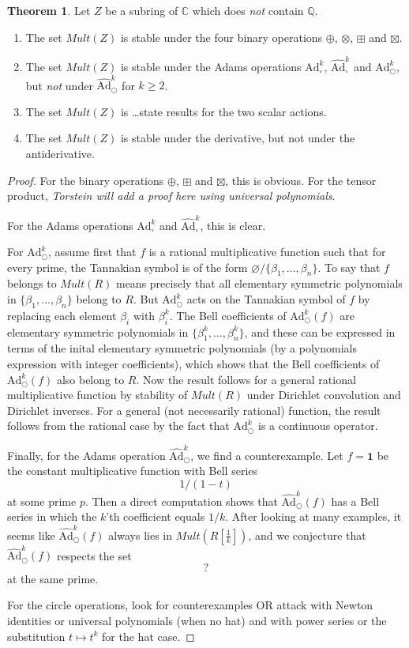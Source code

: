 \documentclass[a4paper]{article}
\theoremstyle{definition}
\newtheorem{theorem}{Theorem}[section]
\theoremstyle{remark}
\newcommand{\adam}[1]{\text{Ad}^{#1}_{\bigcirc}}
\newcommand{\hatadam}[1]{\widehat{\text{Ad}}^{#1}_{\bigcirc}}
\newcommand{\boxadam}[1]{\text{Ad}^{#1}_{\square}}
\newcommand{\hatboxadam}[1]{\widehat{\text{Ad}}^{#1}_{\square}}
\newcommand{\Q}{\mathbb{Q}}
\newcommand{\C}{\mathbb{C}}
\begin{document}
\begin{theorem}
Let $Z$ be a subring of $\C$ which does \emph{not} contain $\Q$.
\begin{enumerate}
\item The set $Mult(Z)$ is stable under the four binary operations $\oplus$, $\otimes$, $\boxplus$ and $\boxtimes$.
\item The set $Mult(Z)$ is stable under the Adams operations $\boxadam{k}$, $\hatboxadam{k}$ and $\adam{k}$, but \emph{not} under $\hatadam{k}$ for $k \geq 2$. 
\item The set $Mult(Z)$ is \ldots state results for the two scalar actions.
\item The set $Mult(Z)$ is stable under the derivative, but not under the antiderivative.
\end{enumerate}
\end{theorem}

\begin{proof}
For the binary operations $\oplus$, $\boxplus$ and $\boxtimes$, this is obvious. For the tensor product, \emph{Torstein will add a proof here using universal polynomials}. 

For the Adams operations $\boxadam{k}$ and $\hatboxadam{k}$, this is clear. 

For $\adam{k}$, assume first that $f$ is a rational multiplicative function such that for every prime, the Tannakian symbol is of the form $ \varnothing / \{ \beta_1, \ldots, \beta_n  \}$. To say that $f$ belongs to $Mult(R)$ means precisely that all elementary symmetric polynomials in $\{ \beta_1, \ldots, \beta_n  \}$ belong to $R$. But $\adam{k}$ acts on the Tannakian symbol of $f$ by replacing each element $\beta_i$ with $\beta_i^k$. The Bell coefficients of $\adam{k}(f)$ are elementary symmetric polynomials in $\{ \beta_1^k, \ldots, \beta_n^k  \}$, and these can be expressed in terms of the inital elementary symmetric polynomials (by a polynomials expression with integer coefficients), which shows that the Bell coefficients of $\adam{k}(f)$ also belong to $R$. 
Now the result follows for a general rational multiplicative function by stability of $Mult(R)$ under Dirichlet convolution and Dirichlet inverses. For a general (not necessarily rational) function, the result follows from the rational case by the fact that $\adam{k}$ is a continuous operator.

Finally, for the Adams operation $\hatadam{k}$, we find a counterexample. Let $f = \mathbf{1}$ be the constant multiplicative function with Bell series
$$  1 / (1-t) $$
at some prime $p$. Then a direct computation shows that $\hatadam{k}(f)$ has a Bell series in which the $k$'th coefficient equals $1/k$. After looking at many examples, it seems like $\hatadam{k}(f)$ always lies in $Mult(R [\frac{1}{k}])$, and we conjecture that $\hatadam{k}(f)$ respects the set 
$$   ? $$
at the same prime.


For the circle operations, look for counterexamples OR attack with Newton identities or universal polynomials (when no hat) and with power series or the substitution $t \mapsto t^k$ for the hat case.


\end{proof}
\end{document}
